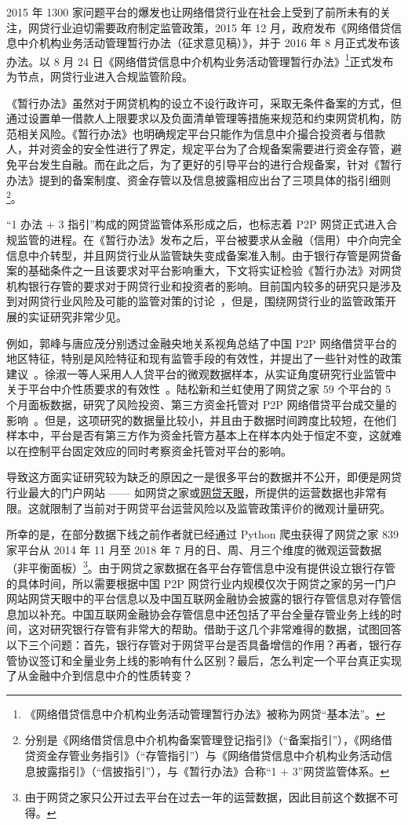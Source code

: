 \documentclass[lang=cn,11pt]{elegantpaper}
\begin{document}
2015 年 1300 家问题平台的爆发也让网络借贷行业在社会上受到了前所未有的关注，网贷行业迫切需要政府制定监管政策，2015 年 12 月，政府发布《网络借贷信息中介机构业务活动管理暂行办法（征求意见稿）》，并于 2016 年 8 月正式发布该办法。以 8 月 24 日《网络借贷信息中介机构业务活动管理暂行办法》\footnote{《网络借贷信息中介机构业务活动管理暂行办法》被称为网贷“基本法”。}正式发布为节点，网贷行业进入合规监管阶段。

《暂行办法》虽然对于网贷机构的设立不设行政许可，采取无条件备案的方式，但通过设置单一借款人上限要求以及负面清单管理等措施来规范和约束网贷机构，防范相关风险。《暂行办法》也明确规定平台只能作为信息中介撮合投资者与借款人，并对资金的安全性进行了界定，规定平台为了合规备案需要进行资金存管，避免平台发生自融。而在此之后，为了更好的引导平台的进行合规备案，针对《暂行办法》提到的备案制度、资金存管以及信息披露相应出台了三项具体的指引细则\footnote{ 分别是《网络借贷信息中介机构备案管理登记指引》（“备案指引”），《网络借贷资金存管业务指引》（“存管指引”）与《网络借贷信息中介机构业务活动信息披露指引》（“信披指引”），与《暂行办法》合称“1 + 3”网贷监管体系。}。

“1 办法 + 3 指引”构成的网贷监管体系形成之后，也标志着 P2P 网贷正式进入合规监管的进程。在《暂行办法》发布之后，平台被要求从金融（信用）中介向完全信息中介转型，并且网贷行业从监管缺失变成备案准入制。由于银行存管是网贷备案的基础条件之一且该要求对平台影响重大，下文将实证检验《暂行办法》对网贷机构银行存管的要求对于网贷行业和投资者的影响。目前国内较多的研究只是涉及到对网贷行业风险及可能的监管对策的讨论~\citep{lsq2014,wj2015,awhxmy2016}，但是，围绕网贷行业的监管政策开展的实证研究非常少见。

例如，郭峰与唐应茂分别透过金融央地关系视角总结了中国 P2P 网络借贷平台的地区特征，特别是风险特征和现有监管手段的有效性，并提出了一些针对性的政策建议~\citep{gf2016,tym2017}。徐淑一等人采用人人贷平台的微观数据样本，从实证角度研究行业监管中关于平台中介性质要求的有效性~\citep{xsypylwyq2018}。陆松新和兰虹使用了网贷之家 59 个平台的 5 个月面板数据，研究了风险投资、第三方资金托管对 P2P 网络借贷平台成交量的影响~\citep{lsxlh2015}。但是，这项研究的数据量比较小，并且由于数据时间跨度比较短，在他们样本中，平台是否有第三方作为资金托管方基本上在样本内处于恒定不变，这就难以在控制平台固定效应的同时考察资金托管对平台的影响。

导致这方面实证研究较为缺乏的原因之一是很多平台的数据并不公开，即便是网贷行业最大的门户网站 —— 如网贷之家或\href{https://www.p2peye.com/}{网贷天眼}，所提供的运营数据也非常有限。这就限制了当前对于网贷平台运营风险以及监管政策评价的微观计量研究。

所幸的是，在部分数据下线之前作者就已经通过 Python 爬虫获得了网贷之家 839 家平台从 2014 年 11 月至 2018 年 7 月的日、周、月三个维度的微观运营数据（非平衡面板）\footnote{由于网贷之家只公开过去平台在过去一年的运营数据，因此目前这个数据不可得。}。由于网贷之家数据在各平台存管信息中没有提供设立银行存管的具体时间，所以需要根据中国 P2P 网贷行业内规模仅次于网贷之家的另一门户网站网贷天眼中的平台信息以及中国互联网金融协会披露的银行存管信息对存管信息加以补充。中国互联网金融协会存管信息中还包括了平台全量存管业务上线的时间，这对研究银行存管有非常大的帮助。借助于这几个非常难得的数据，试图回答以下三个问题：首先，银行存管对于网贷平台是否具备增信的作用？再者，银行存管协议签订和全量业务上线的影响有什么区别？最后，怎么判定一个平台真正实现了从金融中介到信息中介的性质转变？
\end{document}
